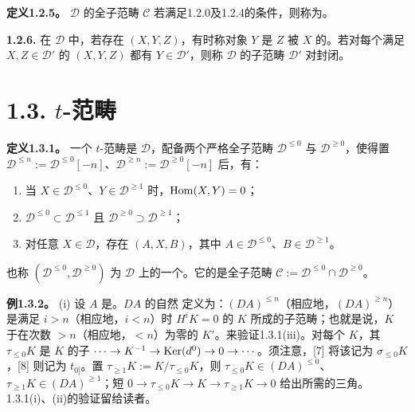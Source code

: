 \par\medskip\noindent\textbf{定义1.2.5。} $\mathcal D$ 的全子范畴 $\mathcal C$ 若满足1.2.0及1.2.4的条件，则称为。

\par\medskip\noindent\textbf{1.2.6.} 在 $\mathcal D$ 中，若存在 $(X,Y,Z)$，有时称对象 $Y$ 是 $Z$ 被 $X$ 的。若对每个满足 $X,Z\in\mathcal D'$ 的 $(X,Y,Z)$ 都有 $Y\in\mathcal D'$，则称 $\mathcal D$ 的子范畴 $\mathcal D'$ 对封闭。

\section*{1.3. $t$-范畴}
\par\medskip\noindent\textbf{定义1.3.1。} 一个 $t$-范畴是 $\mathcal D$，配备两个严格全子范畴 $\mathcal D^{\leq0}$ 与 $\mathcal D^{\geq0}$，使得置 $\mathcal D^{\leq n}:=\mathcal D^{\leq0}[-n]$、$\mathcal D^{\geq n}:=\mathcal D^{\geq0}[-n]$ 后，有：
\begin{enumerate}[label=(\roman*)]
\item 当 $X\in\mathcal D^{\leq0}$、$Y\in\mathcal D^{\geq1}$ 时，$\operatorname{Hom}(X,Y)=0$；
\item $\mathcal D^{\leq0}\subset\mathcal D^{\leq1}$ 且 $\mathcal D^{\geq0}\supset\mathcal D^{\geq1}$；
\item 对任意 $X\in\mathcal D$，存在 $(A,X,B)$，其中 $A\in\mathcal D^{\leq0}$、$B\in\mathcal D^{\geq1}$。
\end{enumerate}
也称 $(\mathcal D^{\leq0},\mathcal D^{\geq0})$ 为 $\mathcal D$ 上的一个。它的是全子范畴 $\mathcal C:=\mathcal D^{\leq0}\cap\mathcal D^{\geq0}$。

\par\medskip\noindent\textbf{例1.3.2。} (i) 设 $A$ 是。$DA$ 的自然 定义为：$(DA)^{\leq n}$（相应地，$(DA)^{\geq n}$）是满足 $i>n$（相应地，$i<n$）时 $H^iK=0$ 的 $K$ 所成的子范畴；也就是说，$K$ 于在次数 $>n$（相应地，$<n$）为零的 $K'$。来验证1.3.1(iii)。对每个 $K$，其 $\tau_{\leq0}K$ 是 $K$ 的子 $\cdots\to K^{-1}\to\operatorname{Ker}(d^0)\to0\to\cdots$。须注意，[7] 将该记为 $\sigma_{\leq0}K$，[8] 则记为 $t_{0]}$。置 $\tau_{\geq1}K:=K/\tau_{\leq0}K$，则 $\tau_{\leq0}K\in(DA)^{\leq0}$、$\tau_{\geq1}K\in(DA)^{\geq1}$；短 $0\to\tau_{\leq0}K\to K\to\tau_{\geq1}K\to0$ 给出所需的三角。1.3.1(i)、(ii)的验证留给读者。

